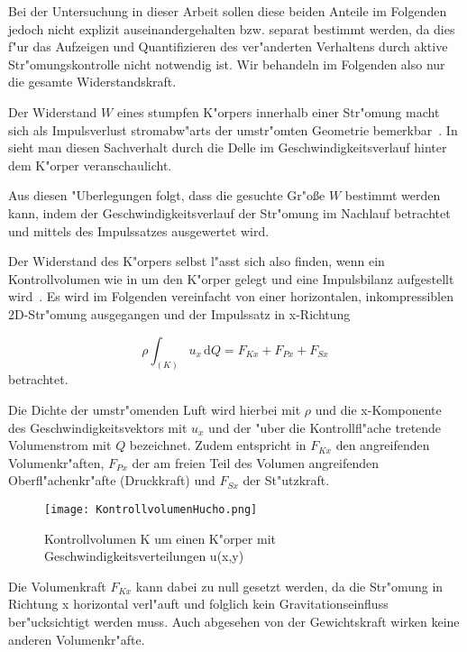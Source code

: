 Bei der Untersuchung in dieser Arbeit sollen diese beiden Anteile im Folgenden jedoch nicht explizit auseinandergehalten bzw. separat bestimmt werden, da dies f"ur das Aufzeigen und Quantifizieren des ver"anderten Verhaltens durch aktive Str"omungskontrolle nicht notwendig ist.  Wir behandeln im Folgenden also nur die gesamte Widerstandskraft.

Der Widerstand $W$ eines stumpfen K"orpers innerhalb einer Str"omung macht sich als Impulsverlust stromabw"arts der umstr"omten Geometrie bemerkbar~\cite{Hucho.2011}. In  sieht man diesen Sachverhalt durch die Delle im Geschwindigkeitsverlauf hinter dem K"orper veranschaulicht. %

Aus diesen "Uberlegungen folgt, dass die gesuchte Gr"o\ss{}e $W$ bestimmt werden kann, indem der Geschwindigkeitsverlauf der Str"omung im Nachlauf betrachtet und mittels des Impulssatzes ausgewertet wird. 

Der Widerstand des K"orpers selbst l"asst sich also finden, wenn ein Kontrollvolumen wie in  um den K"orper gelegt und eine Impulsbilanz aufgestellt wird~\cite{Hucho.2011}. Es wird im Folgenden vereinfacht von einer horizontalen, inkompressiblen 2D-Str"omung ausgegangen und der Impulssatz in x-Richtung

\begin{equation}
	\label{eq:impulssatz_allg}
	\rho \int_{(K)} u_x \, \mathrm{d}Q = F_{Kx} + F_{Px} + F_{Sx}
\end{equation}
betrachtet.

Die Dichte der umstr"omenden Luft wird hierbei mit $\rho$ und die x-Komponente des Geschwindigkeitsvektors mit $u_x$ und der "uber die Kontrollfl"ache tretende Volumenstrom mit $Q$ bezeichnet.
Zudem entspricht in  $F_{Kx}$ den angreifenden Volumenkr"aften, $F_{Px}$ der am freien Teil des Volumen angreifenden Oberfl"achenkr"afte (Druckkraft) und $F_{Sx}$ der St"utzkraft.

\begin{figure}[h]
	\centering
	\texttt{[image: KontrollvolumenHucho.png]}
	\caption{Kontrollvolumen K um einen K"orper mit Geschwindigkeitsverteilungen u(x,y)~\cite{Hucho.2011}}
	\label{fig:HuchoKV}
\end{figure}

Die Volumenkraft $F_{Kx}$ kann dabei zu null gesetzt werden, da die Str"omung in Richtung x horizontal verl"auft und folglich kein Gravitationseinfluss ber"ucksichtigt werden muss. Auch abgesehen von der Gewichtskraft wirken keine anderen Volumenkr"afte.

